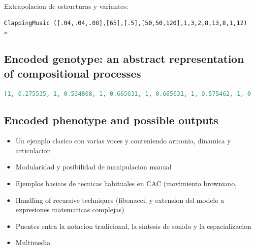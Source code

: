 \documentclass{article}
\begin{document}
Extrapolacion de estructuras y variantes:

{\small \begin{verbatim}ClappingMusic ([.04,.04,.08],[65],[.5],[50,50,120],1,3,2,8,13,8,1,12) =\end{verbatim}}  


\subsection{Encoded genotype: an abstract representation of compositional processes}

\begin{lstlisting}[language=Java, caption=Encoded genotype for S. Reich's \emph{Clapping Music}]
[1, 0.275535, 1, 0.534808, 1, 0.665631, 1, 0.665631, 1, 0.575462, 1, 0.575462, 1, 0.606798, 1, 0.27051, 0.51, 0.5, 0, 1, 0.506578, 0.53, 0.53, 0, 1, 0.742646, 0.55, 0.51346, 0, 1, 0.36068, 0.56, 0.6, 0.56, 0.6, 0.56, 0.9, 0.56, 0, 0, 0, 1, 0.534808, 1, 0.304952, 0.57, 0, 0, 1, 0.416408, 0.58, 0.55, 0, 0, 0, 1, 0.534808, 1, 0.304952, 0.57, 0.854102, 0, 1, 0.416408, 0.58, 0.6, 0, 0, 0, 1, 0.416408, 0.58, 0.75, 0, 0, 1, 0.416408, 0.58, 0.84, 0, 0, 1, 0.416408, 0.58, 0.75, 0, 0, 1, 0.575462, 1, 0.304952, 0.57, 0.326238, 0, 1, 0.665631, 1, 0.534808, 1, 0.304952, 0.57, 0.18034, 0, 1, 0.416408, 0.58, 0.55, 0, 0, 1, 0.416408, 0.58, 0.82, 0, 0, 0, 0]
\end{lstlisting}

\subsection{Encoded phenotype and possible outputs}

{\color{red}


\begin{itemize}



\item Un ejemplo clasico con varias voces y conteniendo armonia, dinamica y articulacion
\item Modularidad y posibilidad de manipulacion manual
\item Ejemplos basicos de tecnicas habituales en CAC (movimiento browniano,
\item Handling of recursive techniques (fibonacci, y extension del modelo a expresiones matematicas complejas)
\item Puentes entra la notacion tradicional, la sintesis de sonido y la espacializacion
\item Multimedia
\end{itemize}

}
\end{document}

